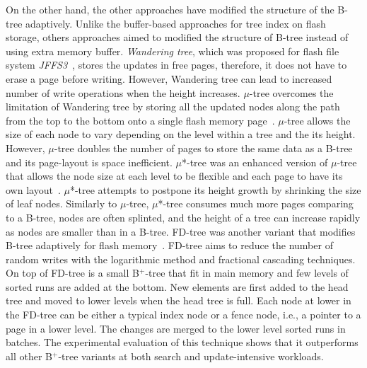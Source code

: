 On the other hand, the other approaches have modified the structure of the B-tree adaptively.
Unlike the buffer-based approaches for tree index on flash storage, others approaches aimed to modified the structure of B-tree instead of using extra memory buffer.
\textit{Wandering tree}, which was proposed for flash file system \textit{JFFS3}~\citep{Bityuckiy:2005}, stores the updates in free pages, therefore, it does not have to erase a page before writing.
However, Wandering tree can lead to increased number of write operations when the height increases.
{\Large $\mu$}-tree overcomes the limitation of Wandering tree by storing all the updated nodes along the path from the top to the bottom onto a single flash memory page~\citep{Kang:2007}.
{\Large $\mu$}-tree allows the size of each node to vary depending on the level within a tree and the its height.
However, $\mu$-tree doubles the number of pages to store the same data as a B-tree and its page-layout is space inefficient.
{\Large $\mu$}*-tree was an enhanced version of $\mu$-tree that allows the node size at each level to be flexible and each page to have its own layout~\citep{Jin-Soo:2013}. 
{\Large $\mu$}*-tree attempts to postpone its height growth by shrinking the size of leaf nodes. 
Similarly to $\mu$-tree, $\mu$*-tree consumes much more pages comparing to a B-tree, nodes are often splinted, and the height of a tree can increase rapidly as nodes are smaller than in a B-tree. 
FD-tree was another variant that modifies B-tree adaptively for flash memory~\citep{Li:2010}.
FD-tree aims to reduce the number of random writes with the logarithmic method and fractional cascading techniques.
On top of FD-tree is a small B$^{+}$-tree that fit in main memory and few levels of sorted runs are added at the bottom. 
New elements are first added to the head tree and moved to lower levels when the head tree is full.
Each node at lower in the FD-tree can be either a typical index node or a fence node, i.e., a pointer to a page in a lower level.
The changes are merged to the lower level sorted runs in batches.
The experimental evaluation of this technique shows that it outperforms all other B$^{+}$-tree variants at both search and update-intensive workloads.

